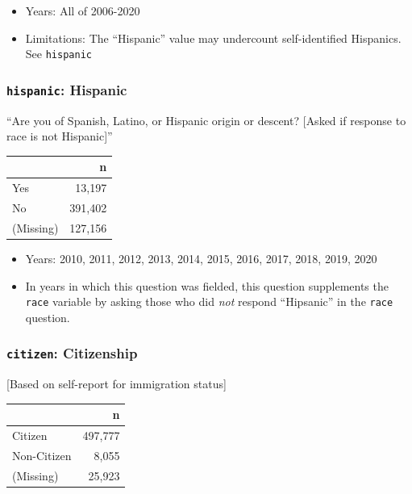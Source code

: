 \documentclass[10pt,article,oneside]{memoir}
\theoremstyle{definition}
\begin{document}
\begin{itemize}
\tightlist
\item
  Years: All of 2006-2020
\item
  Limitations: The ``Hispanic'' value may undercount self-identified
  Hispanics. See \texttt{hispanic}
\end{itemize}

\hypertarget{hispanic-hispanic}{%
\subsubsection{\texorpdfstring{\texttt{hispanic}:
Hispanic}{hispanic: Hispanic}}\label{hispanic-hispanic}}

``Are you of Spanish, Latino, or Hispanic origin or descent? {[}Asked if
response to race is not Hispanic{]}''

\begin{table}[H]
\centering
\begin{tabular}{lr}
\toprule
 & n\\
\midrule
Yes & 13,197\\
No & 391,402\\
(Missing) & 127,156\\
\bottomrule
\end{tabular}
\end{table}

\begin{itemize}
\tightlist
\item
  Years: 2010, 2011, 2012, 2013, 2014, 2015, 2016, 2017, 2018, 2019,
  2020
\item
  In years in which this question was fielded, this question supplements
  the \texttt{race} variable by asking those who did \emph{not} respond
  ``Hipsanic'' in the \texttt{race} question.
\end{itemize}

\hypertarget{citizen-citizenship}{%
\subsubsection{\texorpdfstring{\texttt{citizen}:
Citizenship}{citizen: Citizenship}}\label{citizen-citizenship}}

{[}Based on self-report for immigration status{]}

\begin{table}[H]
\centering
\begin{tabular}{lr}
\toprule
 & n\\
\midrule
Citizen & 497,777\\
Non-Citizen & 8,055\\
(Missing) & 25,923\\
\bottomrule
\end{tabular}
\end{table}
\end{document}
